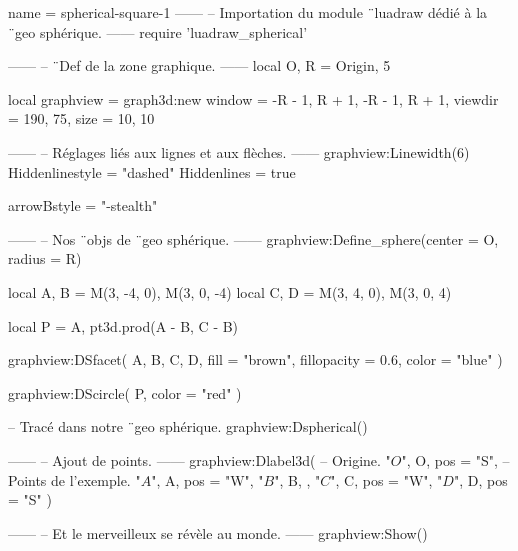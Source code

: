 \documentclass{standalone}
\begin{document}
\begin{luadraw}{name = spherical-square-1}
------
-- Importation du module ¨luadraw dédié à la ¨geo sphérique.
------
require 'luadraw_spherical'

------
-- ¨Def de la zone graphique.
------
local O, R = Origin, 5

local graphview = graph3d:new{
  window  = {-R - 1, R + 1, -R - 1, R + 1},
  viewdir = {190, 75},
  size    = {10, 10}
}

------
-- Réglages liés aux lignes et aux flèches.
------
graphview:Linewidth(6)
Hiddenlinestyle = "dashed"
Hiddenlines     = true

arrowBstyle = "-stealth"

------
-- Nos ¨objs de ¨geo sphérique.
------
graphview:Define_sphere({center = O, radius = R})

local A, B = M(3, -4, 0), M(3, 0, -4)
local C, D = M(3, 4, 0), M(3, 0, 4)

local P = {A, pt3d.prod(A - B, C - B)}

graphview:DSfacet(
  {A, B, C, D},
  {fill = "brown", fillopacity = 0.6, color = "blue"}
)

graphview:DScircle(
  P,
  {color = "red"}
)

-- Tracé dans notre ¨geo sphérique.
graphview:Dspherical()

------
-- Ajout de points.
------
graphview:Dlabel3d(
-- Origine.
  "$O$", O, {pos = "S"},
-- Points de l'exemple.
  "$A$", A, {pos = "W"},
  "$B$", B, {},
  "$C$", C, {pos = "W"},
  "$D$", D, {pos = "S"}
)

------
-- Et le merveilleux se révèle au monde.
------
graphview:Show()
\end{luadraw}
\end{document}
